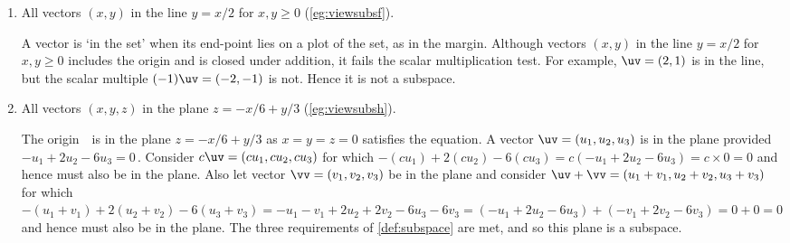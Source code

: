 \begin{example}
\begin{enumerate}
\item All vectors \((x,y)\) in the line \(y=x/2\) for \(x,y\geq0\) (\autoref{eg:viewsubsf}).
\begin{solution} 
A vector is `in the set' when its end-point lies on a plot of the set, as in the margin.
%
Although vectors \((x,y)\) in the line \(y=x/2\) for \(x,y\geq0\) includes the origin and is closed under addition, it fails the scalar multiplication test.
For example, \(\uv=(2,1)\) is in the line, but the scalar multiple \((-1)\uv=(-2,-1)\) is not.
Hence it is not a subspace.
\end{solution}


\item All vectors \((x,y,z)\) in the plane \(z=-x/6+y/3\) (\autoref{eg:viewsubsh}).
\begin{center}
\end{center}
\begin{solution} 
The origin~\ov\ is in the plane \(z=-x/6+y/3\) as \(x=y=z=0\) satisfies the equation.
A vector \(\uv=(u_1,u_2,u_3)\) is in the plane provided \(-u_1+2u_2-6u_3=0\)\,.
Consider \(c\uv=(cu_1,cu_2,cu_3)\) for which \(-(cu_1)+2(cu_2)-6(cu_3) =c(-u_1+2u_2-6u_3) =c\times0=0\) and hence must also be in the plane.
Also let vector \(\vv=(v_1,v_2,v_3)\) be in the plane and consider \(\uv+\vv=(u_1+v_1,u_2+v_2,u_3+v_3)\) for which \(-(u_1+v_1)+2(u_2+v_2)-6(u_3+v_3) =-u_1-v_1+2u_2+2v_2-6u_3-6v_3 =(-u_1+2u_2-6u_3) +(-v_1+2v_2-6v_3) =0+0 =0\) and hence must also be in the plane.
The three requirements of \autoref{def:subspace} are met, and so this plane is a subspace.
\end{solution}



\end{enumerate}
\end{example}
